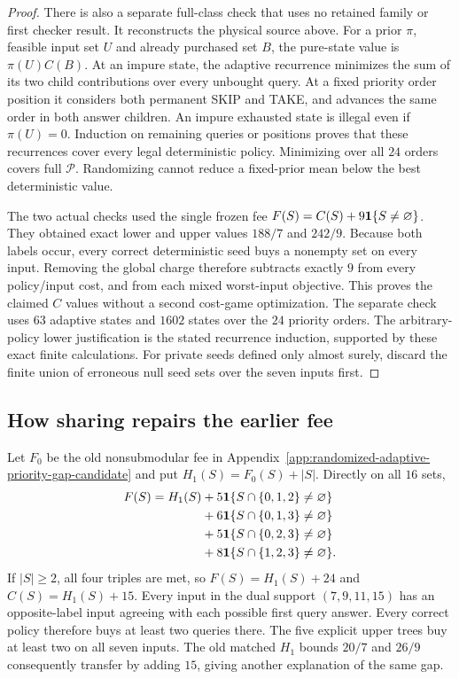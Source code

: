 \begin{proof}
There is also a separate full-class check that uses no retained family
or first checker result. It reconstructs the physical source above.
For a prior $\pi$, feasible input set $U$ and already purchased set $B$,
the pure-state value is $\pi(U)C(B)$. At an impure state, the adaptive
recurrence minimizes the sum of its two child contributions over every
unbought query. At a fixed priority order position it considers both
permanent SKIP and TAKE, and advances the same order in both answer
children. An impure exhausted state is illegal even if $\pi(U)=0$.
Induction on remaining queries or positions proves that these recurrences
cover every legal deterministic policy. Minimizing over all $24$ orders
covers full $\mathcal P$. Randomizing cannot reduce a fixed-prior mean
below the best deterministic value.

The two actual checks used the single frozen fee
$F(S)=C(S)+9{\bf1}\{S\ne\varnothing\}$. They obtained exact lower
and upper values $188/7$ and $242/9$. Because both labels occur, every
correct deterministic seed buys a nonempty set on every input. Removing
the global charge therefore subtracts exactly $9$ from every policy/input
cost, and from each mixed worst-input objective. This proves the claimed
$C$ values without a second cost-game optimization. The separate check
uses $63$ adaptive states and $1602$ states over the $24$ priority orders.
The arbitrary-policy lower justification is the stated recurrence
induction, supported by these exact finite calculations.
For private seeds defined only almost surely, discard the finite union
of erroneous null seed sets over the seven inputs first.
\end{proof}

\subsection{How sharing repairs the earlier fee}
Let $F_0$ be the old nonsubmodular fee in
Appendix~\ref{app:randomized-adaptive-priority-gap-candidate} and put
$H_1(S)=F_0(S)+|S|$. Directly on all $16$ sets,
\begin{align*}
 F(S)=H_1(S)&+5{\bf1}\{S\cap\{0,1,2\}\ne\varnothing\}\\
 &+6{\bf1}\{S\cap\{0,1,3\}\ne\varnothing\}\\
 &+5{\bf1}\{S\cap\{0,2,3\}\ne\varnothing\}\\
 &+8{\bf1}\{S\cap\{1,2,3\}\ne\varnothing\}.
\end{align*}
If $|S|\geq2$, all four triples are met, so $F(S)=H_1(S)+24$ and
$C(S)=H_1(S)+15$. Every input in the dual support $(7,9,11,15)$
has an opposite-label input agreeing with each possible first query
answer. Every correct policy therefore buys at least two queries there.
The five explicit upper trees buy at least two on all seven inputs.
The old matched $H_1$ bounds $20/7$ and $26/9$ consequently transfer
by adding $15$, giving another explanation of the same gap.

